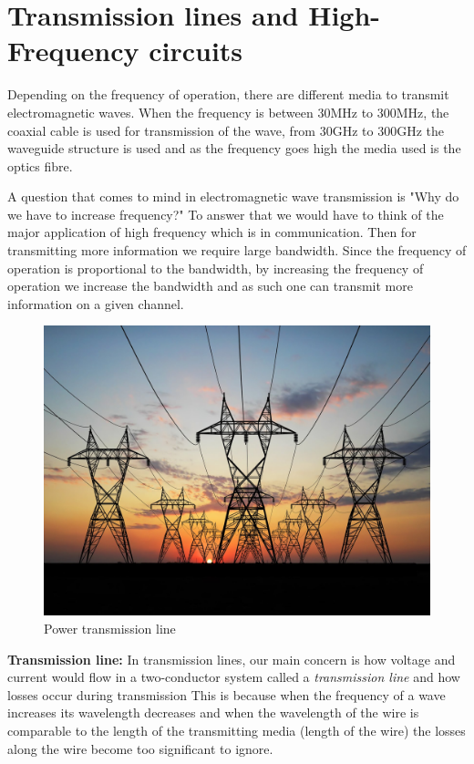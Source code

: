 \section{Transmission lines and High-Frequency circuits}

Depending on the frequency of operation, there are different media to transmit electromagnetic waves. When the frequency is between 30MHz to 300MHz, the coaxial cable is used for transmission of the wave, from 30GHz to 300GHz the waveguide structure is used and as the frequency goes high the media used is the optics fibre.

A question that comes to mind in electromagnetic wave transmission is "Why do we have to increase frequency?" To answer that we would have to think of the major application of high frequency which is in communication. Then for transmitting more information we require large bandwidth. Since the frequency of operation is proportional to the bandwidth, by increasing the frequency of operation we increase the bandwidth and as such one can transmit more information on a given channel.
\begin{figure}[h]
\centering
\includegraphics[scale=0.1]{./graphics/transmission2}
\caption{Power transmission line}
\end{figure}

\textbf{Transmission line:} In transmission lines, our main concern is how voltage and current would flow in a two-conductor system called a \textit{transmission line} and how losses occur during transmission This is because when the frequency of a wave increases its wavelength decreases and when the wavelength of the wire is comparable to the length of the transmitting media (length of the wire) the losses along the wire become too significant to ignore.

